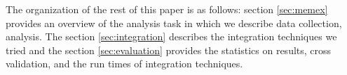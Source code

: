 



The organization of the rest of this paper is as follows: section \ref{sec:memex} provides an overview of the analysis task in which we describe data collection, analysis. The section \ref{sec:integration} describes the integration techniques we tried and the section \ref{sec:evaluation} provides the statistics on results, cross validation, and the run times of integration techniques.
